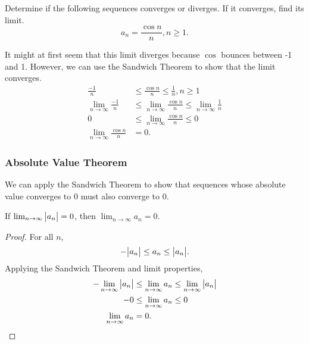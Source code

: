 \begin{example}
	Determine if the following sequences converges or diverges.
	If it converges, find its limit.
	\begin{equation*}
		a_n = \frac{\cos{n}}{n}, n\geq 1.
	\end{equation*}
\end{example}
\begin{answer}
	It might at first seem that this limit diverges because $\cos$ bounces between -1 and 1.
	However, we can use the Sandwich Theorem to show that the limit converges.
	\begin{align*}
		\frac{-1}{n} &\leq \frac{\cos{n}}{n} \leq \frac{1}{n}, n\geq 1 \\
		\lim_{n\to\infty}{\frac{-1}{n}} &\leq \lim_{n\to\infty}{\frac{\cos{n}}{n}} \leq \lim_{n\to\infty}{\frac{1}{n}} \\
		0 &\leq \lim_{n\to\infty}{\frac{\cos{n}}{n}} \leq 0 \\
		\lim_{n\to\infty}{\frac{\cos{n}}{n}} &= 0.
	\end{align*}
\end{answer}

\subsubsection{Absolute Value Theorem}
We can apply the Sandwich Theorem to show that sequences whose absolute value converges to 0 must also converge to 0.
\begin{theorem}
	If $\lim_{n\to\infty}{\big\lvert a_n \big\rvert} = 0$, then $\lim_{n\to\infty}{a_n} = 0$.
\end{theorem}
\begin{proof}
	For all $n$,
	\begin{equation*}
		-\big\lvert a_n \big\rvert \leq a_n \leq \big\lvert a_n \big\rvert.
	\end{equation*}
	Applying the Sandwich Theorem and limit properties,
	\begin{align*}
		-\lim_{n\to\infty}{\big\lvert a_n \big\rvert} &\leq \lim_{n\to\infty}{a_n} \leq \lim_{n\to\infty}{\big\lvert a_n \big\rvert} \\
		-0 &\leq \lim_{n\to\infty}{a_n} \leq 0 \\
		\lim_{n\to\infty}{a_n} &= 0.
	\end{align*}
\end{proof}
